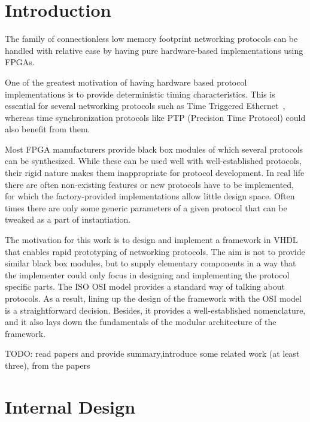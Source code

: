 \documentclass[conference]{IEEEtran}
\begin{document}

\section{Introduction}\label{sec:Motivation}

The family of connectionless low memory footprint networking protocols can be handled with relative ease by having pure
hardware-based implementations using FPGAs.

One of the greatest motivation of having hardware based protocol implementations is to provide deterministic timing
characteristics. This is essential for several networking protocols such as Time Triggered Ethernet~\cite{SAE_AS6802},
whereas time synchronization protocols like PTP (Precision Time Protocol) \cite{PTP_standard}could also benefit from
them.

Most FPGA manufacturers provide black box modules of which several protocols can be synthesized. While these can be used
well with well-established protocols, their rigid nature makes them inappropriate for protocol development. In real
life there are often non-existing features
or new protocols have to be implemented, for which the factory-provided implementations allow little design space.
Often times there are only some generic parameters of a given protocol that can be tweaked as a part of instantiation.

The motivation for this work is to design and implement a framework in VHDL that enables rapid prototyping of
networking protocols. The aim is not to provide similar black box modules, but to supply elementary components in a way
that the implementer could only focus in designing and implementing the protocol specific parts. The ISO OSI model
provides a standard way of talking about protocols. As a result, lining up the design of the framework with the OSI
model is a straightforward decision. Besides, it provides a well-established nomenclature, and it also lays down the
fundamentals of the modular architecture of the framework.


TODO: read papers and provide summary,introduce some related work (at least three), from the papers

\section{Internal Design}\label{sec:Internal Design}
\end{document}
